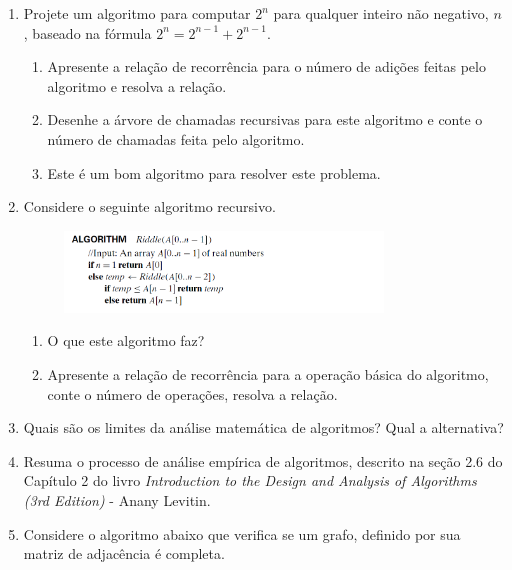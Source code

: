 \documentclass{article}
\begin{document}
\begin{enumerate}
    
    \item Projete um algoritmo para computar $2^n$ para qualquer inteiro não negativo, $n$, baseado na fórmula $2^n = 2^{n-1} + 2^{n-1}$.
    \begin{enumerate}
        \item Apresente a relação de recorrência para o número de adições feitas pelo algoritmo e resolva a relação.
        \item Desenhe a árvore de chamadas recursivas  para este algoritmo e conte o número de chamadas feita pelo algoritmo.
        \item Este é um bom algoritmo para resolver este problema.
    \end{enumerate}
    
    \item Considere o seguinte algoritmo recursivo.
    
    \begin{figure}[!ht]
        \centering
        \includegraphics[width=0.8\textwidth]{alg_a.PNG}
        \label{fig:my_label}
    \end{figure}
    
    \begin{enumerate}
        \item O que este algoritmo faz?
        \item Apresente a relação de recorrência para a operação básica do algoritmo, conte o número de operações, resolva a relação.
    \end{enumerate}
    
    \item Quais são os limites da análise matemática de algoritmos? Qual a alternativa?
    
    \item Resuma o processo de análise empírica de algoritmos, descrito na seção 2.6 do Capítulo 2 do livro \textit{Introduction to the Design and Analysis of Algorithms (3rd Edition)} - Anany Levitin.
    
    \item Considere o algoritmo abaixo que verifica se um grafo, definido por sua matriz de adjacência é completa. 
    

\end{enumerate}
\end{document}

